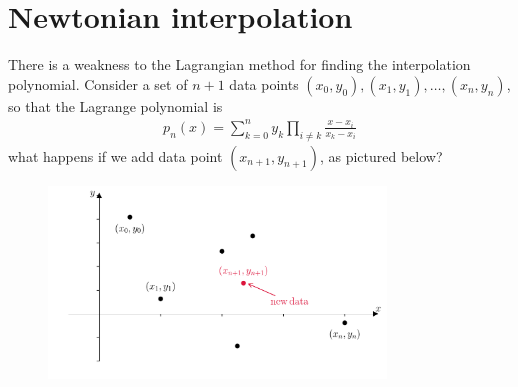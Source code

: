 \section{Newtonian interpolation}
There is a weakness to the Lagrangian method for finding the interpolation polynomial. Consider a set of $n+1$ data points $(x_0,y_0), (x_1,y_1), \dots, (x_n,y_n)$, so that the Lagrange polynomial is
\begin{align*}
p_n(x) = \sum_{k=0}^n y_k \prod_{i\neq k} \frac{x-x_i}{x_k-x_i} 
\end{align*}
what happens if we add data point $(x_{n+1},y_{n+1})$, as pictured below?
\begin{figure}[H]
	\begin{center}
	\includegraphics[width=0.8\textwidth]{figures/ch3_newton_purpose.pdf} 
	  \caption{} \label{fig:ch3_newton_purpose}
	\end{center}
\end{figure}

